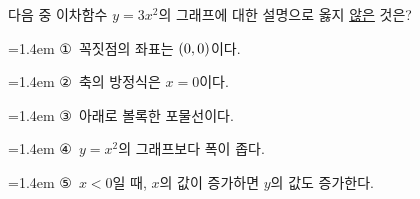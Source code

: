 다음 중 이차함수 $y=3x^2$의 그래프에 대한 설명으로 옳지 \underline{않은} 것은?
\par\medskip\par\noindent\hangindent=1.4em {\small ①}\ 꼭짓점의 좌표는 $(0{,}\mkern3mu\mathopen{}0)$이다.\par\noindent\hangindent=1.4em {\small ②}\ 축의 방정식은 $x=0$이다.\par\noindent\hangindent=1.4em {\small ③}\ 아래로 볼록한 포물선이다.\par\noindent\hangindent=1.4em {\small ④}\ $y=x^2$의 그래프보다 폭이 좁다.\par\noindent\hangindent=1.4em {\small ⑤}\ $x<0$일 때, $x$의 값이 증가하면 $y$의 값도 증가한다.\par\medskip

